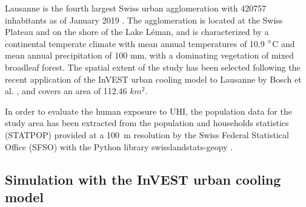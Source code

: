 \documentclass[10pt,letterpaper]{article}
\begin{document}
Lausanne is the fourth largest Swiss urban agglomeration with 420757 inhabitants as of January 2019 \cite{sfso2018city}. The agglomeration is located at the Swiss Plateau and on the shore of the Lake L\'eman, and is characterized by a continental temperate climate with mean annual temperatures of 10.9 $\degree$C and mean annual precipitation of 100 mm, with a dominating vegetation of mixed broadleaf forest. The spatial extent of the study has been selected following the recent application of the InVEST urban cooling model to Lausanne by Bosch et al. \cite{bosch2020spatially}, and covers an area of 112.46 $km^2$.

In order to evaluate the human exposure to UHI, the population data for the study area has been extracted from the population and households statistics (STATPOP) \cite{sfso2020statistique} provided at a 100~m resolution by the Swiss Federal Statistical Office (SFSO) with the Python library swisslandstats-geopy \cite{bosch2019swisslandstats}. 


\subsection*{Simulation with the InVEST urban cooling model}
\end{document}
